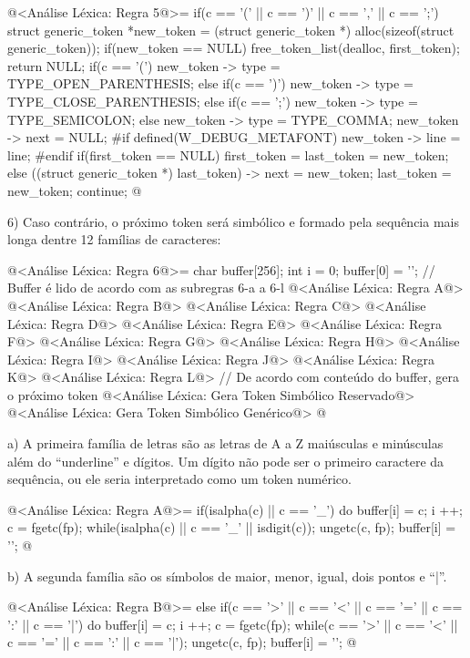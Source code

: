 \iniciocodigo
@<Análise Léxica: Regra 5@>=
if(c == '(' || c == ')' || c == ',' || c == ';'){
  struct generic_token *new_token =
     (struct generic_token *) alloc(sizeof(struct generic_token));
  if(new_token == NULL){
    free_token_list(dealloc, first_token);
    return NULL;
  }
  if(c == '(')
    new_token -> type = TYPE_OPEN_PARENTHESIS;
  else if(c == ')')
    new_token -> type = TYPE_CLOSE_PARENTHESIS;
  else if(c == ';')
    new_token -> type = TYPE_SEMICOLON;
  else
    new_token -> type = TYPE_COMMA;
  new_token -> next = NULL;
#if defined(W_DEBUG_METAFONT)
  new_token -> line = line;
#endif
  if(first_token == NULL)
    first_token = last_token = new_token;
  else{
    ((struct generic_token *) last_token) -> next = new_token;
    last_token = new_token;
  }
  continue;
}
@
\fimcodigo

6) Caso contrário, o próximo token será simbólico e formado pela
sequência mais longa dentre 12 famílias de caracteres:

\iniciocodigo
@<Análise Léxica: Regra 6@>=
{
  char buffer[256];
  int i = 0;
  buffer[0] = '\0';
  // Buffer é lido de acordo com as subregras 6-a a 6-l
  @<Análise Léxica: Regra A@>
  @<Análise Léxica: Regra B@>
  @<Análise Léxica: Regra C@>
  @<Análise Léxica: Regra D@>
  @<Análise Léxica: Regra E@>
  @<Análise Léxica: Regra F@>
  @<Análise Léxica: Regra G@>
  @<Análise Léxica: Regra H@>
  @<Análise Léxica: Regra I@>
  @<Análise Léxica: Regra J@>
  @<Análise Léxica: Regra K@>
  @<Análise Léxica: Regra L@>
  // De acordo com conteúdo do buffer, gera o próximo token
  @<Análise Léxica: Gera Token Simbólico Reservado@>
  @<Análise Léxica: Gera Token Simbólico Genérico@>
}
@
\fimcodigo


a) A primeira família de letras são as letras de A a Z maiúsculas e
minúsculas além do ``underline'' e dígitos. Um dígito não pode ser o
primeiro caractere da sequência, ou ele seria interpretado como um
token numérico.


\iniciocodigo
@<Análise Léxica: Regra A@>=
if(isalpha(c) || c == '_'){
  do{
    buffer[i] = c;
    i ++;
    c = fgetc(fp);
  } while(isalpha(c) || c == '_' || isdigit(c));
  ungetc(c, fp);
  buffer[i] = '\0';
}
@
\fimcodigo

b) A segunda família são os símbolos de maior, menor, igual, dois
pontos e ``|''.

\iniciocodigo
@<Análise Léxica: Regra B@>=
else if(c == '>' || c == '<' || c == '=' || c == ':' || c == '|'){
  do{
    buffer[i] = c;
    i ++;
    c = fgetc(fp);
  } while(c == '>' || c == '<' || c == '=' || c == ':' || c == '|');
  ungetc(c, fp);
  buffer[i] = '\0';
}
@
\fimcodigo

